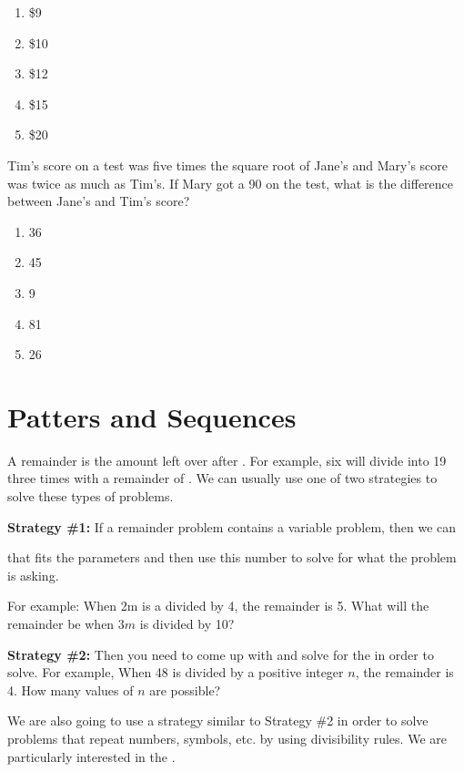 \begin{multienumerate}
{\begin{enumerate}[label=(\Alph*)]
\item \$9
\item \$10
\item \$12
\item \$15
\item \$20
\end{enumerate}}{\advanced

Tim's score on a test was five times the square root of Jane's and Mary's score was twice as much as Tim's. If Mary got a 90 on the test, what is the difference between Jane's and Tim's score?

\begin{enumerate}[label=(\Alph*)]
\item 36
\item 45
\item 9
\item 81
\item 26
\end{enumerate}}
\end{multienumerate}

\newpage
\section{Patters and Sequences}

A remainder is the amount left over after \longline. For example, six will divide into 19 three times with a remainder of \longline.
We can usually use one of two strategies to solve these types of problems.

\vfill
\textbf{Strategy \#1:} If a remainder problem contains a variable problem, then we can

\longline that fits the parameters and then use this number to solve for what the problem is asking. 

\bigskip
For example: When 2m is a divided by 4, the remainder is 5. What will the remainder be when $3m$ is divided by 10?

\vfill
\textbf{Strategy \#2:} Then you need to come up with \longline and solve for the \longline in order to solve. 
For example, When 48 is divided by a positive integer $n$, the remainder is 4. How many values of $n$ are possible?

\vfill
We are also going to use a strategy similar to Strategy \#2 in order to solve problems that repeat numbers, symbols, etc. by using divisibility rules. We are particularly interested in the  \longline.

